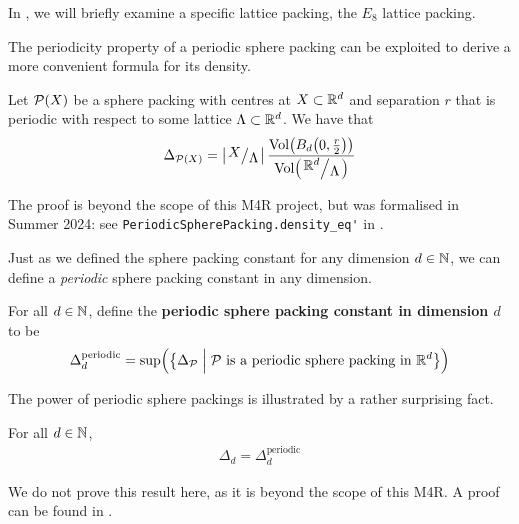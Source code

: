 In , we will briefly examine a specific lattice packing, the $E_8$ lattice packing.

The periodicity property of a periodic sphere packing can be exploited to derive a more convenient formula for its density.

\begin{boxproposition}\label{Ch2:Prop:Periodic_Density}
    Let $\mathcal{P}(X)$ be a sphere packing with centres at $X \subset \mathbb{R}^d$ and separation $r$ that is periodic with respect to some lattice $\Lambda \subset \mathbb{R}^d$. We have that
    \begin{align}
        \Delta_{\Pa(X)} = \abs{\quotient{X}{\Lambda}} \frac{\Volof{B_d\of{0, \frac{r}{2}}}}{\Volof{\quotient{\R^d}{\Lambda}}}
        \label{Ch2:Eq:Periodic_Density}
    \end{align}
\end{boxproposition}

The proof is beyond the scope of this M4R project, but was formalised in Summer 2024: see \verb|PeriodicSpherePacking.density_eq'| in \cite[\texttt{SpherePacking.Basic.PeriodicPacking}]{documentation}.

Just as we defined the sphere packing constant for any dimension $d \in \mathbb{N}$, we can define a \textit{periodic} sphere packing constant in any dimension.

\begin{boxdefinition}
    For all $d \in \mathbb{N}$, define the \textbf{periodic sphere packing constant in dimension $d$} to be
    \begin{align*}
        \Delta_{d}^{\text{periodic}} = \sup\!\left( {\left\{ \Delta_{\mathcal{P}} \; \middle\vert \; \mathcal{P} \text{ is a periodic sphere packing in } \mathbb{R}^d \right\}} \right)
    \end{align*}
\end{boxdefinition}

The power of periodic sphere packings is illustrated by a rather surprising fact.

\begin{boxproposition}\label{Ch2:Prop:Periodic_Const_eq_Const}
    For all $d \in \mathbb{N}$,
    \begin{align*}
        \Delta_{d} = \Delta_{d}^{\text{periodic}}
    \end{align*}
\end{boxproposition}

We do not prove this result here, as it is beyond the scope of this M4R. A proof can be found in \cite[Appendix A]{CohnElkies}.

